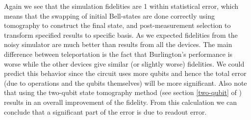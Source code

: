 Again we see that the simulation fidelities are 1 within
statistical error, which means that the swapping of initial Bell-states are done
correctly using tomography to construct the final state, and post-measurement
selection to transform specified results to specific basis. As we expected
fidelities from the noisy simulator are much better than results from all the
devices. The main difference between teleportation is the fact that Burlington's
performance is worse while the other devices give similar (or slightly worse)
fidelities. We could predict this behavior since the circuit uses more qubits
and hence the total error (due to operations and the qubits themselves) will be
more significant. Also note that using the two-qubit state tomography method
(see section \ref{two-qubit} of ) results in
an overall improvement of the fidelity. From this calculation we can conclude
that a significant part of the error is due to readout error. 
\newpage
